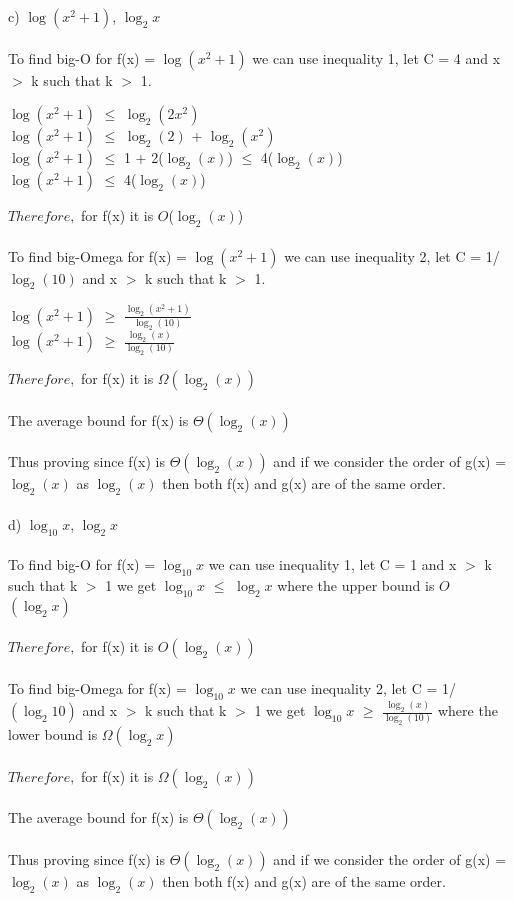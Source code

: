 \documentclass{article}
\begin{document}
c) $\log(x^2 + 1 )$, $\log_{2}{x}$ \\ \\ 
To find big-O for f(x) =  $\log(x^2 + 1)$ we can use inequality 1, let C = 4 and x $>$ k such that k $>$ 1.
\begin{center}
$\log(x^2 + 1 )$ $\leq$ $\log_{2}{(2x^2)}$ \\
$\log(x^2 + 1 )$ $\leq$ $\log_{2}{(2)}$ + $\log_{2}{(x^2)}$\\
$\log(x^2 + 1 )$ $\leq$ 1 + 2($\log_{2}{(x)}$) $\leq$ 4($\log_{2}{(x)}$) \\
$\log(x^2 + 1 )$ $\leq$ 4($\log_{2}{(x)}$) \\
\end{center}
$Therefore,$ for f(x) it is $O$($\log_{2}{(x)}$) \\ \\ 
To find big-Omega for f(x) =  $\log(x^2 + 1)$ we can use inequality 2, let C = 1/$\log_{2}{(10)}$ and x $>$ k such that k $>$ 1. 
\begin{center}
$\log(x^2 + 1 )$ $\geq$ $\frac {\log_{2}{(x^2+1)}}{\log_{2}{(10)}}$ \\
$\log(x^2 + 1 )$ $\geq$ $\frac {\log_{2}{(x)}}{\log_{2}{(10)}}$  \\
\end{center}
$Therefore,$ for f(x) it is $\Omega(\log_{2}{(x)})$ \\ \\ 
The average bound for f(x) is $\Theta(\log_{2}{(x)})$ \\ \\ 
Thus proving since f(x) is $\Theta(\log_{2}{(x)})$ and if we consider the order of g(x) = $\log_{2}{(x)}$ as $\log_{2}{(x)}$ then both f(x) and g(x) are of the same order. \\ \\
d) $\log_{10}{x}$, $\log_{2}{x}$ \\ \\ 
To find big-O for f(x) =  $\log_{10}{x}$ we can use inequality 1, let C = 1 and x $>$ k such that k $>$ 1 we get $\log_{10}{x} $ $\leq$ $\log_{2}{x}$ where the upper bound is $O$ $(\log_{2}{x})$ \\\\
$Therefore,$ for f(x) it is $O(\log_{2}{(x)})$ \\ \\ 
To find big-Omega for f(x) =  $\log_{10}{x}$ we can use inequality 2, let C = 1/$(\log_{2}{10})$ and x $>$ k such that k $>$ 1 we get $\log_{10}{x} $ $\geq$ $\frac {\log_{2}{(x)}}{\log_{2}{(10)}}$ where the lower bound is $\Omega$$(\log_{2}{x})$ \\\\
$Therefore,$ for f(x) it is $\Omega(\log_{2}{(x)})$ \\ \\ 
The average bound for f(x) is $\Theta(\log_{2}{(x)})$ \\ \\ 
Thus proving since f(x) is $\Theta(\log_{2}{(x)})$ and if we consider the order of g(x) = $\log_{2}{(x)}$ as $\log_{2}{(x)}$ then both f(x) and g(x) are of the same order.
\newpage 
\end{document}
